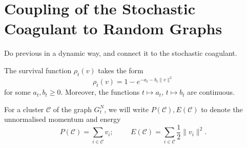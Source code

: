 \section{Coupling of the Stochastic Coagulant to Random Graphs} \label{sec: coupling_to_random_graph}
Do previous in a dynamic way, and connect it to the stochastic coagulant. 
\begin{lemma}\label{lemma: form of rho-t}
    The survival function $\rho_t(v)$ takes the form \begin{equation}
        \rho_t(v)=1-e^{-a_t-b_t\|v\|^2}
    \end{equation} for some $a_t, b_t \geq 0$. Moreover, the functions $t\mapsto a_t$, $t\mapsto b_t$ are continuous.
\end{lemma}
For a cluster $\mathcal{C}$ of the graph $G^N_t$, we will write $P(\mathcal{C}), E(\mathcal{C})$ to denote the unnormalised momentum and energy \begin{equation}
    P(\mathcal{C})=\sum_{i\in \mathcal{C}} v_i;\hspace{1cm} E(\mathcal{C})=\sum_{i\in \mathcal{C}} \frac{1}{2}\|v_i\|^2.
\end{equation}